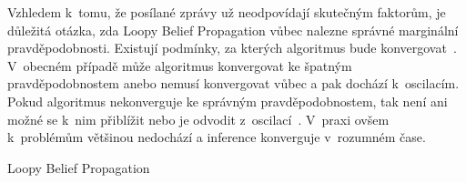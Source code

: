 Vzhledem k~tomu, že posílané zprávy už neodpovídají skutečným faktorům, je důležitá otázka, zda Loopy Belief Propagation vůbec nalezne správné marginální pravděpodobnosti.
Existují podmínky, za kterých algoritmus bude konvergovat~\cite{tatikonda2002loopy}.
V~obecném případě může algoritmus konvergovat ke špatným pravděpodobnostem anebo nemusí konvergovat vůbec a pak dochází k~oscilacím.
Pokud algoritmus nekonverguje ke správným pravděpodobnostem, tak není ani možné se k~nim přiblížit nebo je odvodit z~oscilací~\cite{murphy1999loopy}.
V~praxi ovšem k~problémům většinou nedochází a inference konverguje v~rozumném čase.

\begin{algorithm}
\caption{Loopy Belief Propagation}
\label{alg:lbp}
\begin{algorithmic}
\State

\Repeat
            \Else
            \EndIf
        \EndFor
    \EndFor
{}

\EndFor
\EndFunction

\State

\State

    \EndFor
\EndFor
\EndFunction

\State

\State

\EndFunction

\State

\State

\EndFunction
\end{algorithmic}
\end{algorithm}

